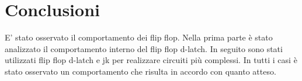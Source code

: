 \section{Conclusioni}
E' stato osservato il comportamento dei flip flop. Nella prima parte è stato analizzato il comportamento interno del flip flop d-latch. In seguito sono stati utilizzati flip flop d-latch e jk per realizzare circuiti più complessi. In tutti i casi è stato osservato un comportamento che risulta in accordo con quanto atteso.  